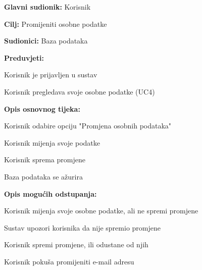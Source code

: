 					\noindent {}
					\begin{packed_item}
	
						\item \textbf{Glavni sudionik: }Korisnik
						\item  \textbf{Cilj:} Promijeniti osobne podatke
						\item  \textbf{Sudionici:} Baza podataka
						\item  \textbf{Preduvjeti:}
						\item[] \begin{packed_enum}
							\item Korisnik je prijavljen u sustav
							\item Korisnik pregledava svoje osobne podatke (UC4)
						\end{packed_enum}
						\item  \textbf{Opis osnovnog tijeka:}
						
						\item[] \begin{packed_enum}
	
							\item Korisnik odabire opciju "Promjena osobnih podataka"
							\item Korisnik mijenja svoje podatke
							\item Korisnik sprema promjene
							\item Baza podataka se ažurira
						\end{packed_enum}
						
						\item  \textbf{Opis mogućih odstupanja:}
						
						\item[] \begin{packed_item}
	
							\item[2.a] Korisnik mijenja svoje osobne podatke, ali ne spremi promjene
							\item[] \begin{packed_enum}
								
								\item Sustav upozori korisnika da nije spremio promjene
								\item Korisnik spremi promjene, ili odustane od njih
								
							\end{packed_enum}
							
							\item[2.b] Korisnik pokuša promijeniti e-mail adresu
							\item[] \begin{packed_enum}
								

\end{packed_enum}
\end{packed_item}
\end{packed_item}
